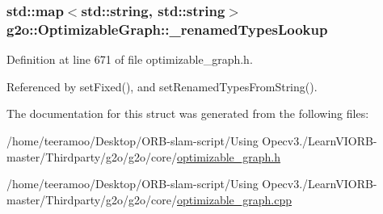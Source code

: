 \subsubsection[{\texorpdfstring{\+\_\+renamed\+Types\+Lookup}{_renamedTypesLookup}}]{\setlength{\rightskip}{0pt plus 5cm}std\+::map$<$std\+::string, std\+::string$>$ g2o\+::\+Optimizable\+Graph\+::\+\_\+renamed\+Types\+Lookup\hspace{0.3cm}{\ttfamily [protected]}}\hypertarget{structg2o_1_1OptimizableGraph_a726ab6d0b04b12f835b690d54e061731}{}\label{structg2o_1_1OptimizableGraph_a726ab6d0b04b12f835b690d54e061731}


Definition at line 671 of file optimizable\+\_\+graph.\+h.



Referenced by set\+Fixed(), and set\+Renamed\+Types\+From\+String().



The documentation for this struct was generated from the following files\+:\begin{DoxyCompactItemize}
\item 
/home/teeramoo/\+Desktop/\+O\+R\+B-\/slam-\/script/\+Using Opecv3./\+Learn\+V\+I\+O\+R\+B-\/master/\+Thirdparty/g2o/g2o/core/\hyperlink{optimizable__graph_8h}{optimizable\+\_\+graph.\+h}\item 
/home/teeramoo/\+Desktop/\+O\+R\+B-\/slam-\/script/\+Using Opecv3./\+Learn\+V\+I\+O\+R\+B-\/master/\+Thirdparty/g2o/g2o/core/\hyperlink{optimizable__graph_8cpp}{optimizable\+\_\+graph.\+cpp}\end{DoxyCompactItemize}
